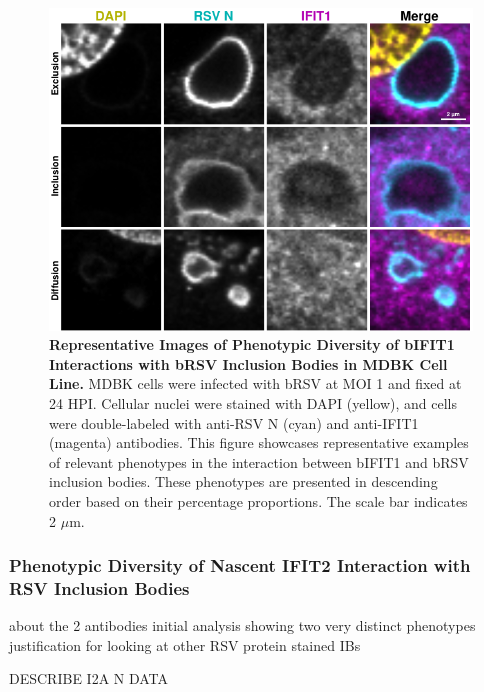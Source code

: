 \begin{figure}
    \centering
    \includegraphics[width=1\linewidth]{08. Chapter 3/Figs/02. Infection/01. IFIT1/09. mdbk i1.pdf}
    \caption[Representative Images of Phenotypic Diversity of bIFIT1 Interactions with bRSV Inclusion Bodies in MDBK Cell Line.]{\textbf{Representative Images of Phenotypic Diversity of bIFIT1 Interactions with bRSV Inclusion Bodies in MDBK Cell Line.} MDBK cells were infected with bRSV at MOI 1 and fixed at 24 HPI. Cellular nuclei were stained with DAPI (yellow), and cells were double-labeled with anti-RSV N (cyan) and anti-IFIT1 (magenta) antibodies. This figure showcases representative examples of relevant phenotypes in the interaction between bIFIT1 and bRSV inclusion bodies. These phenotypes are presented in descending order based on their percentage proportions. The scale bar indicates 2 \(\mu \mbox{m}\).}
    \label{fig:Representative Images of Phenotypic Diversity of bIFIT1 Interactions with bRSV Inclusion Bodies in MDBK Cell Line}
\end{figure}

\subsubsection{Phenotypic Diversity of Nascent IFIT2 Interaction with RSV Inclusion Bodies}

about the 2 antibodies
initial analysis showing two very distinct phenotypes
justification for looking at other RSV protein stained IBs

DESCRIBE I2A N DATA

